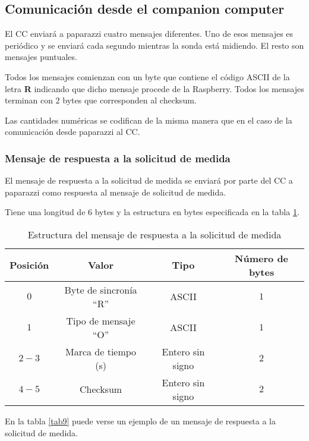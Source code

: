 \subsection{Comunicación desde el companion computer}

El CC enviará a paparazzi cuatro mensajes diferentes. Uno de esos mensajes es periódico y se enviará cada segundo mientras la sonda está midiendo. El resto son mensajes puntuales. 

Todos los mensajes comienzan con un byte que contiene el código ASCII de la letra \textbf{R} indicando que dicho mensaje procede de la Raspberry. Todos los mensajes terminan con $2$ bytes que corresponden al checksum.

Las cantidades numéricas se codifican de la misma manera que en el caso de la comunicación desde paparazzi al CC.

\subsubsection{Mensaje de respuesta a la solicitud de medida}

El mensaje de respuesta a la solicitud de medida se enviará por parte del CC a paparazzi como respuesta al mensaje de solicitud de medida.

Tiene una longitud de $6$ bytes y la estructura en bytes especificada en la tabla \ref{tab8}.

\begin{table}[h]
	\centering
	\caption{Estructura del mensaje de respuesta a la solicitud de medida}
	\begin{tabular}{|c|c|c|c|}\hline 
		\textbf{Posición}	& \textbf{Valor} & \textbf{Tipo} &\textbf{Número de bytes} \\ \hline \hline 
		$0$		& Byte de sincronía ``R''				& ASCII	 			&	$1$ \\  \hline
		$1$		& Tipo de mensaje ``O''				& ASCII	 			&	$1$ \\  \hline
		$2-3$	& Marca de tiempo (s)				& Entero sin signo	&   $2$ \\  \hline
		$4-5$	& Checksum 							& Entero sin signo	&   $2$ \\  \hline
	\end{tabular}
	\label{tab8}
\end{table}

En la tabla \ref{tab9} puede verse un ejemplo de un mensaje de respuesta a la solicitud de medida.

